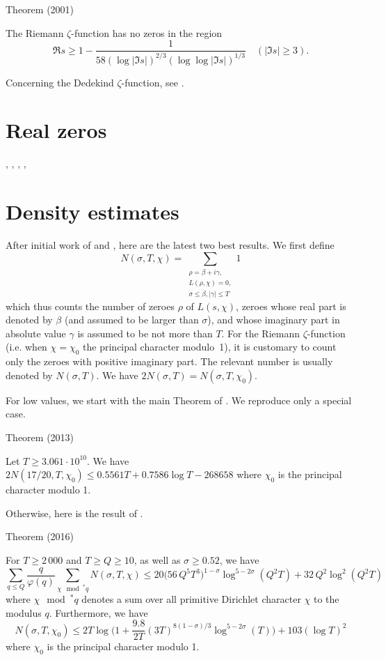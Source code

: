 \begin{thm}{Theorem (2001)}

  The Riemann $\zeta$-function has no zeros in the region
  $$
    \Re s\ge  1-\frac{1}{58(\log |\Im s|)^{2/3}(\log\log |\Im s|)^{1/3}}
    \quad(|\Im s|\ge 3).
  $$
\end{thm}


Concerning the Dedekind $\zeta$-function, see
\cite{Kadiri*12}.



\section{Real zeros
}


\cite{Rosser*49},
\cite{Rosser*50},
\cite{Chua*05},
\cite{Watkins*00-1},

\section{Density estimates
}


After initial work of
\cite{Chen-Wang*89-2}
and
\cite{Liu-Wang*02-1},
here are the latest two best results. We first define
$$
  N(\sigma,T,\chi)=\sum_{\substack{\rho=\beta+i\gamma,\\ L(\rho,\chi)=0,\\
      \sigma\le \beta, |\gamma|\le T}}1
$$
which thus counts the number of zeroes $\rho$ of $L(s,\chi)$, zeroes
whose real part is denoted by $\beta$ (and assumed to be larger than
$\sigma$), and whose imaginary part in absolute value $\gamma$ is assumed to be
not more than $T$. For the Riemann $\zeta$-function (i.e. when
$\chi=\chi_0$ the principal character modulo~1), it is customary
to count only the zeroes with positive imaginary part. The relevant
number is usually denoted by $N(\sigma,T)$. We have $2N(\sigma,T)=N(\sigma,T,\chi_0)$.

For low values, we start with the main Theorem of
\cite{Kadiri-Ng*12}.
We reproduce only a special case.


\begin{thm}{Theorem (2013)}

  Let $T\ge3.061\cdot10^{10}$. We have
  $
    2N(17/20,T,\chi_0)\le 0.5561T+0.7586\log T-268 658
  $
  where $\chi_0$ is the principal character modulo 1.
\end{thm}


Otherwise, here is the result of
\cite{Ramare*13d}.


\begin{thm}{Theorem (2016)}

  For $T\ge2\,000$ and $T\ge Q\ge10$, as well as $\sigma\ge0.52$, we have 
  $$
    \sum_{q\le Q}\frac{q}{\varphi(q)}
    \sum_{\chi\mod^* q}N(\sigma,T,\chi)
    \le 
    20\bigl(56\,Q^{5}T^3\bigr)^{1-\sigma}\log^{5-2\sigma}(Q^2T)
    +32\,Q^2\log^2(Q^2T)
  $$
  where $\chi\mod^* q$ denotes a sum over all primitive Dirichlet character
  $\chi$ to the modulus $q$. Furthermore, we have
  $$
    N(\sigma,T,\chi_0)\le 2T
    \log\biggl(1+\frac{9.8}{2T}(3T)^{8(1-\sigma)/{3}}\log^{5-2\sigma}(T)\biggr)
    +103(\log T)^2
  $$
  where $\chi_0$ is the principal character modulo 1.
\end{thm}




